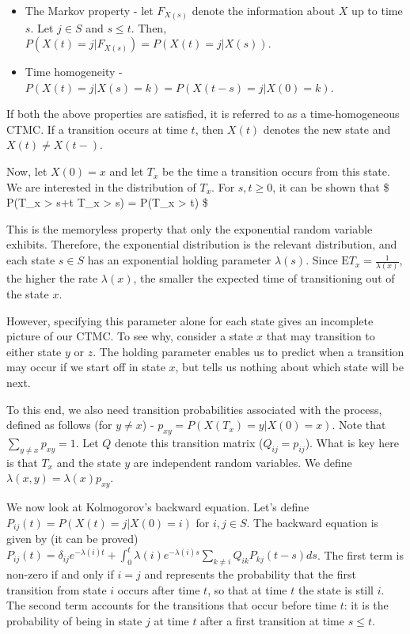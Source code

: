 \documentclass[
  nojss]{jss}
\providecommand{\tightlist}{%
  \setlength{\itemsep}{0pt}\setlength{\parskip}{0pt}}
\begin{document}
\begin{itemize}
\tightlist
\item
  The Markov property - let \(F_{X(s)}\) denote the information about \(X\) up to time \(s\). Let \(j \in S\) and \(s \leq t\). Then, \(P(X(t) = j|F_{X(s)}) = P(X(t) = j|X(s))\).
\item
  Time homogeneity - \(P(X(t) = j|X(s) = k) = P(X(t-s) = j|X(0) = k)\).
\end{itemize}

If both the above properties are satisfied, it is referred to as a time-homogeneous CTMC. If a transition occurs at time \(t\), then \(X(t)\) denotes the new state and \(X(t)\neq X(t-)\).

Now, let \(X(0)=x\) and let \(T_x\) be the time a transition occurs from this state. We are interested in the distribution of \(T_x\). For \(s,t \geq 0\), it can be shown that \$ P(T\_x \textgreater{} s+t \textbar{} T\_x \textgreater{} s) = P(T\_x \textgreater{} t) \$

This is the memoryless property that only the exponential random variable exhibits. Therefore, the exponential distribution is the relevant distribution, and each state \(s \in S\) has an exponential holding parameter \(\lambda(s)\). Since \(\mathrm{E}T_x = \frac{1}{\lambda(x)}\), the higher the rate \(\lambda(x)\), the smaller the expected time of transitioning out of the state \(x\).

However, specifying this parameter alone for each state gives an incomplete picture of our CTMC. To see why, consider a state \(x\) that may transition to either state \(y\) or \(z\). The holding parameter enables us to predict when a transition may occur if we start off in state \(x\), but tells us nothing about which state will be next.

To this end, we also need transition probabilities associated with the process, defined as follows (for \(y \neq x\)) - \(p_{xy} = P(X(T_x) = y | X(0) = x)\). Note that \(\sum_{y \neq x} p_{xy} = 1\). Let \(Q\) denote this transition matrix (\(Q_{ij} = p_{ij}\)). What is key here is that \(T_x\) and the state \(y\) are independent random variables. We define \(\lambda(x, y) = \lambda(x) p_{xy}\).

We now look at Kolmogorov's backward equation. Let's define \(P_{ij}(t) = P(X(t) = j | X(0) = i)\) for \(i, j \in S\). The backward equation is given by (it can be proved) \(P_{ij}(t) = \delta_{ij}e^{-\lambda(i)t} + \int_{0}^{t}\lambda(i)e^{-\lambda(i)s} \sum_{k \neq i} Q_{ik} P_{kj}(t-s) ds\). The first term is non-zero if and only if \(i=j\) and represents the probability that the first transition from state \(i\) occurs after time \(t\), so that at time \(t\) the state is still \(i\). The second term accounts for the transitions that occur before time \(t\): it is the probability of being in state \(j\) at time \(t\) after a first transition at time \(s \le t\).
\end{document}
